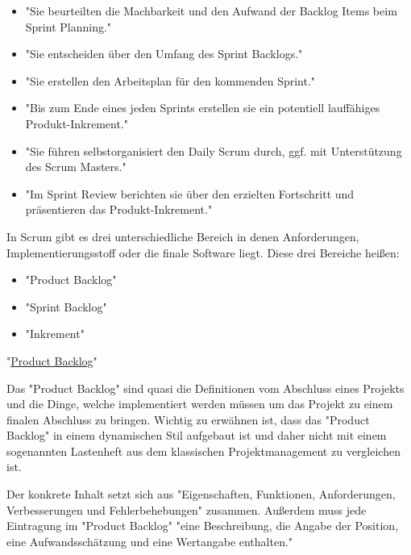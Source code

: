 \begin{itemize}
    \item "Sie beurteilten die Machbarkeit und den Aufwand der Backlog Items beim Sprint Planning." \cite{Entwicklungsteam}
    \item "Sie entscheiden über den Umfang des Sprint Backlogs." \cite{Entwicklungsteam}
    \item "Sie erstellen den Arbeitsplan für den kommenden Sprint." \cite{Entwicklungsteam}
    \item "Bis zum Ende eines jeden Sprints erstellen sie ein potentiell lauffähiges Produkt-Inkrement." \cite{Entwicklungsteam}
    \item "Sie führen selbstorganisiert den Daily Scrum durch, ggf. mit Unterstützung des Scrum Masters." \cite{Entwicklungsteam}
    \item "Im Sprint Review berichten sie über den erzielten Fortschritt und präsentieren das Produkt-Inkrement." \cite{Entwicklungsteam}
\end{itemize}


In Scrum gibt es drei unterschiedliche Bereich in denen Anforderungen, Implementierungsstoff oder die finale Software liegt. Diese drei Bereiche heißen:

\begin{itemize}
    \item "Product Backlog"
    \item "Sprint Backlog"
    \item "Inkrement"
\end{itemize}

\cite{Scrum}

"\underline{Product Backlog}"

Das "Product Backlog" sind quasi die Definitionen vom Abschluss eines Projekts und die Dinge, welche implementiert werden müssen um das Projekt zu einem finalen Abschluss zu bringen. Wichtig zu erwähnen ist, dass das "Product Backlog" in einem dynamischen Stil aufgebaut ist und daher nicht mit einem sogenannten Lastenheft aus dem klassischen Projektmanagement zu vergleichen ist. \cite{ProductBacklog}

Der konkrete Inhalt setzt sich aus "Eigenschaften, Funktionen, Anforderungen, Verbesserungen und Fehlerbehebungen" \cite{ProductBacklog} zusammen.  Außerdem muss jede Eintragung im "Product Backlog" "eine Beschreibung, die Angabe der Position, eine Aufwandsschätzung und eine Wertangabe enthalten." \cite{ProductBacklog}

